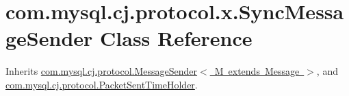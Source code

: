 \hypertarget{classcom_1_1mysql_1_1cj_1_1protocol_1_1x_1_1_sync_message_sender}{}\section{com.\+mysql.\+cj.\+protocol.\+x.\+Sync\+Message\+Sender Class Reference}
\label{classcom_1_1mysql_1_1cj_1_1protocol_1_1x_1_1_sync_message_sender}


Inherits \mbox{\hyperlink{interfacecom_1_1mysql_1_1cj_1_1protocol_1_1_message_sender}{com.\+mysql.\+cj.\+protocol.\+Message\+Sender$<$ M extends Message $>$}}, and \mbox{\hyperlink{interfacecom_1_1mysql_1_1cj_1_1protocol_1_1_packet_sent_time_holder}{com.\+mysql.\+cj.\+protocol.\+Packet\+Sent\+Time\+Holder}}.

